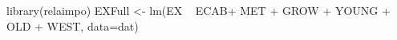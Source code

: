 \begin{Schunk}
\begin{Sinput}
 library(relaimpo)
 EXFull <- lm(EX ~ ECAB+ MET + GROW + YOUNG + OLD + WEST, data=dat) 
\end{Sinput}
\end{Schunk}
